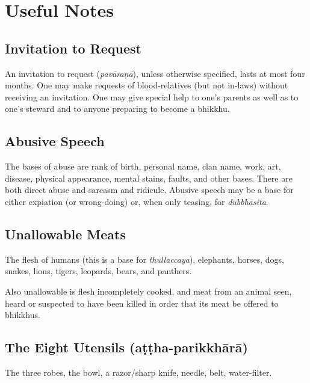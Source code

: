 \chapter{Useful Notes}

\section*{Invitation to Request}

An invitation to request (\emph{pavāraṇā}), unless otherwise specified, lasts at
most four months. One may make requests of blood-relatives (but not in-laws)
without receiving an invitation. One may give special help to one's parents as
well as to one's steward and to anyone preparing to become a bhikkhu.


\section*{Abusive Speech}

The bases of abuse are rank of birth, personal name, clan name, work, art,
disease, physical appearance, mental stains, faults, and other bases. There are
both direct abuse and sarcasm and ridicule. Abusive speech may be a base for
either expiation (or wrong-doing) or, when only teasing, for \emph{dubbhāsita}.


\section*{Unallowable Meats}

The flesh of humans (this is a base for \emph{thullaccaya}), elephants, horses,
dogs, snakes, lions, tigers, leopards, bears, and panthers.\\
\mbox{}

Also unallowable is flesh incompletely cooked, and meat from an animal seen,
heard or suspected to have been killed in order that its meat be offered to
bhikkhus.\\
\mbox{}

\section*{The Eight Utensils (aṭṭha-parikkhārā)}

The three robes, the bowl, a razor/sharp knife, needle, belt, water-filter.\\
\mbox{}

\vspace*{-\baselineskip}

